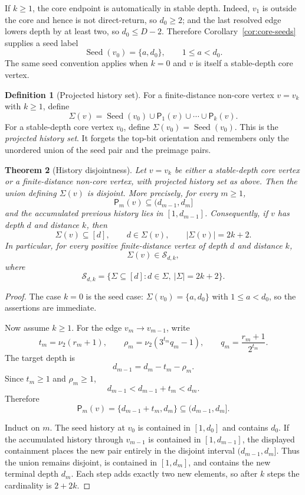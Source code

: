 \documentclass[11pt]{article}
\newtheorem{theorem}{Theorem}[section]
\theoremstyle{definition}
\newtheorem{definition}[theorem]{Definition}
\theoremstyle{remark}
\newcommand{\nuu}{\nu_2}
\newcommand{\Sfam}{\mathcal S}
\newcommand{\Pair}{\mathsf P}
\newcommand{\Seed}{\operatorname{Seed}}
\begin{document}
If $k\ge1$, the core endpoint is automatically in stable depth.  Indeed, $v_1$ is outside the core and hence is not direct-return, so $d_0\ge2$; and the last resolved edge lowers depth by at least two, so $d_0\le D-2$.  Therefore Corollary~\ref{cor:core-seeds} supplies a seed label
\[
\Seed(v_0)=\{a,d_0\},
\qquad
1\le a<d_0.
\]
The same seed convention applies when $k=0$ and $v$ is itself a stable-depth core vertex.

\begin{definition}[Projected history set]\label{def:stable-history-set}
For a finite-distance non-core vertex $v=v_k$ with $k\ge1$, define
\[
\Sigma(v)=\Seed(v_0)\cup\Pair_1(v)\cup\cdots\cup\Pair_k(v).
\]
For a stable-depth core vertex $v_0$, define $\Sigma(v_0)=\Seed(v_0)$.
This is the \emph{projected history set}.  It forgets the top-bit orientation and remembers only the unordered union of the seed pair and the preimage pairs.
\end{definition}

\begin{theorem}[History disjointness]\label{thm:history-disjointness}
Let $v=v_k$ be either a stable-depth core vertex or a finite-distance non-core vertex, with projected history set as above.  Then the union defining $\Sigma(v)$ is disjoint.  More precisely, for every $m\ge1$,
\[
\Pair_m(v)\subseteq(d_{m-1},d_m]
\]
and the accumulated previous history lies in $[1,d_{m-1}]$.  Consequently, if $v$ has depth $d$ and distance $k$, then
\[
\Sigma(v)\subseteq[d],
\qquad
 d\in\Sigma(v),
\qquad
|\Sigma(v)|=2k+2.
\]
In particular, for every positive finite-distance vertex of depth $d$ and distance $k$,
\[
\Sigma(v)\in\Sfam_{d,k},
\]
where
\[
\Sfam_{d,k}=\{\Sigma\subseteq[d]:d\in\Sigma,\ |\Sigma|=2k+2\}.
\]
\end{theorem}

\begin{proof}
The case $k=0$ is the seed case: $\Sigma(v_0)=\{a,d_0\}$ with $1\le a<d_0$, so the assertions are immediate.

Now assume $k\ge1$.  For the edge $v_m\to v_{m-1}$, write
\[
t_m=\nuu(r_m+1),
\qquad
\rho_m=\nuu(3^{t_m}q_m-1),
\qquad
q_m=\frac{r_m+1}{2^{t_m}}.
\]
The target depth is
\[
d_{m-1}=d_m-t_m-\rho_m.
\]
Since $t_m\ge1$ and $\rho_m\ge1$,
\[
d_{m-1}<d_{m-1}+t_m<d_m.
\]
Therefore
\[
\Pair_m(v)=\{d_{m-1}+t_m,d_m\}\subseteq(d_{m-1},d_m].
\]

Induct on $m$.  The seed history at $v_0$ is contained in $[1,d_0]$ and contains $d_0$.  If the accumulated history through $v_{m-1}$ is contained in $[1,d_{m-1}]$, the displayed containment places the new pair entirely in the disjoint interval $(d_{m-1},d_m]$.  Thus the union remains disjoint, is contained in $[1,d_m]$, and contains the new terminal depth $d_m$.  Each step adds exactly two new elements, so after $k$ steps the cardinality is $2+2k$.
\end{proof}
\end{document}
